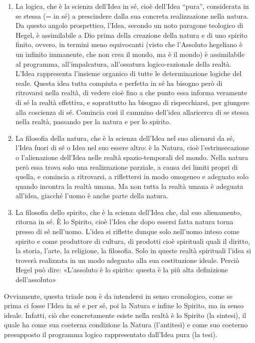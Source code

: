 \documentclass[a4paper,12pt,oneside,openany]{book}%
\begin{document}
\begin{enumerate}
	\item La logica, che è la scienza dell’Idea in sé, cioè dell’Idea “pura”, considerata in se stessa (= in sé) a prescindere dalla sua concreta realizzazione nella natura. Da questo angolo prospettico, l’Idea, secondo un noto paragone teologico di Hegel, è assimilabile a Dio prima della creazione della natura e di uno spirito finito, ovvero, in termini meno equivocanti (visto che l’Assoluto hegeliano è un infinito immanente, che non crea il mondo, ma è il mondo) è assimilabile al programma, all’impalcatura, all’ossatura logico‑razionale della realtà. L’Idea rappresenta l’insieme organico di tutte le determinazione logiche del reale. Questa idea tutta compiuta e perfetta in sé ha bisogno però di ritrovarsi nella realtà, di vedere cioè fino a che punto essa informa veramente di sé la realtà effettiva, e soprattutto ha bisogno di rispecchiarsi, per giungere alla coscienza di sé. Comincia così il cammino dell’idea allaricerca di se stessa nella realtà, passando per la natura e per lo spirito.
	\item La filosofia della natura, che è la scienza dell’Idea nel suo alie­narsi da sé, l’Idea fuori di sé o Idea nel suo essere altro: è la Natura, cioè l’estrinsecazione o l’alienazione dell’Idea nelle realtà spazio‑temporali del mondo. Nella natura però essa trova solo una realizzazione parziale, a causa dei limiti propri di quella, e comincia a ritrovarsi, a riflettersi in modo omogeneo e adeguato solo quando incontra la realtà umana. Ma non tutta la realtà umana è adeguata all’idea, giacché l’uomo è anche parte della natura.
	\item La filosofia dello spirito, che è la scienza dell’Idea che, dal suo alienamen­to, ritorna in sé. È lo Spirito, cioè l’Idea che dopo essersi fatta natura torna presso di sé nell’uomo. L’idea si riflette dunque solo nell’uomo inteso come spirito e come produttore di cultura, di prodotti cioè spirituali quali il diritto, la storia, l’arte, la religione, la filosofia. Solo in queste realtà spirituali l’idea si troverà realizzata in un modo adeguato alla sua costituzione ideale. Perciò Hegel può dire: «L’assoluto è lo spirito: questa è la più alta definizione dell’assoluto»
	
	
\end{enumerate}	

Ovvia­mente, questa triade non è da intendersi in senso cronologico, come se prima ci fosse l’Idea in sé e per sé, poi la Natura e infine lo Spirito, ma in senso ideale. Infatti, ciò che concretamente esiste nella realtà è lo Spirito (la sintesi), il quale ha come sua coeterna condizione la Natura (l’antitesi) e come suo coeterno presupposto il programma logico rappresentato dall’Idea pura (la tesi).
\end{document}
